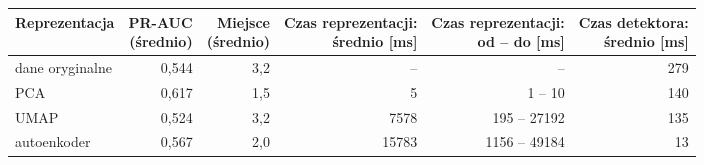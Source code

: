 \begin{tabular}{lrrrrr}
\toprule
Reprezentacja & \makecell[r]{PR-AUC\\(średnio)} & \makecell[r]{Miejsce\\(średnio)} & \makecell[r]{Czas reprezentacji:\\średnio [ms]} & \makecell[r]{Czas reprezentacji:\\od -- do [ms]} & \makecell[r]{Czas detektora:\\średnio [ms]} \\
\midrule
dane oryginalne & 0,544 & 3,2 & -- & -- & 279 \\
PCA & 0,617 & 1,5 & 5 & 1 -- 10 & 140 \\
UMAP & 0,524 & 3,2 & 7578 & 195 -- 27192 & 135 \\
autoenkoder & 0,567 & 2,0 & 15783 & 1156 -- 49184 & 13 \\
\bottomrule
\end{tabular}
